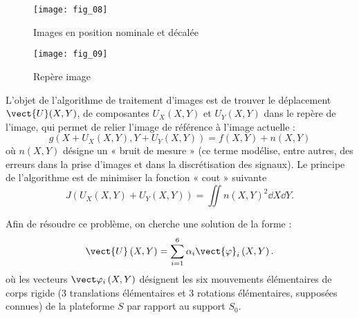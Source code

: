\begin{figure}[H]
\centering
\texttt{[image: fig\_08]}
\caption{\label{fig:08}  Images en position nominale et décalée}
\end{figure}


\begin{figure}[H]
\centering
\texttt{[image: fig\_09]}
\caption{\label{fig:09}  Repère image}
\end{figure}

L’objet de l’algorithme de traitement d’images est de trouver le déplacement $\vect{U}(X,Y)$, de composantes $U_X(X,Y)$ et 
$U_Y(X,Y)$ dans le repère de l’image, qui permet de relier l’image de référence à l’image actuelle :
$$g\left( X + U_X(X,Y),Y + U_Y(X,Y)\right) = f(X,Y)+n(X,Y)$$
où $n(X,Y)$ désigne un « bruit de mesure » (ce terme modélise, entre autres, des erreurs dans la prise d’images et
dans la discrétisation des signaux). Le principe de l’algorithme est de minimiser la fonction « cout » suivante 
$$J\left( U_X(X,Y) + U_Y(X,Y)\right) = \iint n(X,Y)^2 \dd X \dd Y.$$

\ifprof
\begin{corrige}
\end{corrige}
\else
\fi

Afin de résoudre ce problème, on cherche une solution de la forme :
$$
\vect{U}\left(X,Y\right)=\sum\limits_{i=1}^{6}\alpha_i \vect{\varphi}_i \left(X,Y\right).
$$
où les vecteurs $\vect\varphi_i \left(X,Y\right)$ désignent les six mouvements élémentaires de corps rigide (3 translations élémentaires et 3 rotations élémentaires, supposées connues) de la plateforme $S$ par rapport au support $S_0$.

\ifprof
\begin{corrige}
\end{corrige}
\else
\fi


\ifprof
\begin{corrige}
\end{corrige}
\else
\fi


